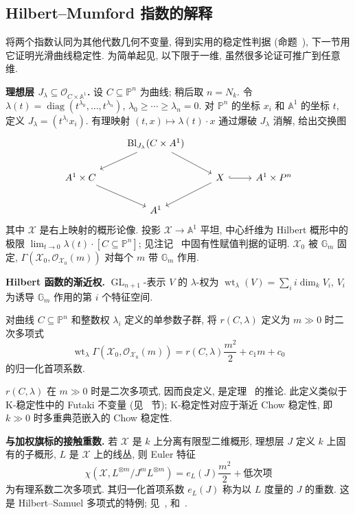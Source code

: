\subsection{Hilbert--Mumford 指数的解释}\label{src:6.8.2-subsection}
将两个指数认同为其他代数几何不变量, 得到实用的稳定性判据 (命题~), 下一节用它证明光滑曲线稳定性. 为简单起见, 以下限于一维, 虽然很多论证可推广到任意维.

\noindent\textbf{理想层 $J_\lambda\subseteq\mathcal O_{C\times\mathbb A^1}$.} 设 $C\subseteq\mathbb P^n$ 为曲线; 稍后取 $n=N_k$. 令 $\lambda(t)=\operatorname{diag}(t^{\lambda_0},\allowbreak \ldots,\allowbreak t^{\lambda_n})$, $\lambda_0\geq\cdots\geq\lambda_n=0$. 对 $\mathbb P^n$ 的坐标 $x_i$ 和 $\mathbb A^1$ 的坐标 $t$, 定义 $J_\lambda=(t^{\lambda_i}x_i)$. 有理映射 $(t,\allowbreak x)\mapsto\lambda(t)\cdot x$ 通过爆破 $J_\lambda$ 消解, 给出交换图
\[
\begin{tikzcd}
&\operatorname{Bl}_{J_\lambda}(C\times\mathbb A^1)\arrow[dl]\arrow[dr]&\\
\mathbb A^1\times C\arrow[dr]& &\mathcal X\arrow[r,hook]\arrow[dl]&\mathbb A^1\times\mathbb P^n\\
&\mathbb A^1&&
\end{tikzcd}
\]
其中 $\mathcal X$ 是右上映射的概形论像. 投影 $\mathcal X\to\mathbb A^1$ 平坦, 中心纤维为 Hilbert 概形中的极限 $\lim_{t\to0}\lambda(t)\cdot[C\subseteq\mathbb P^n]$; 见注记~ 中固有性赋值判据的证明. $\mathcal X_0$ 被 $\mathbb G_m$ 固定, $\Gamma(\mathcal X_0,\allowbreak \mathcal O_{\mathcal X_0}(m))$ 对每个 $m$ 带 $\mathbb G_m$ 作用.

\noindent\textbf{Hilbert 函数的渐近权.} $\operatorname{GL}_{n+1}$-表示 $V$ 的 $\lambda$-权为 $\operatorname{wt}_\lambda(V)=\sum_i i\dim_kV_i$, $V_i$ 为诱导 $\mathbb G_m$ 作用的第 $i$ 个特征空间.
\begin{definition}\label{src:6.8.8}
对曲线 $C\subseteq\mathbb P^n$ 和整数权 $\lambda_i$ 定义的单参数子群, 将 $r(C,\allowbreak \lambda)$ 定义为 $m\gg0$ 时二次多项式
\[
\operatorname{wt}_\lambda\Gamma(\mathcal X_0,\mathcal O_{\mathcal X_0}(m))
=r(C,\lambda)\frac{m^2}{2}+c_1m+c_0
\]
的归一化首项系数.
\end{definition}
$r(C,\allowbreak \lambda)$ 在 $m\gg0$ 时是二次多项式, 因而良定义, 是定理~ 的推论. 此定义类似于 K-稳定性中的 Futaki 不变量 (见~ 节); K-稳定性对应于渐近 Chow 稳定性, 即 $k\gg0$ 时多重典范嵌入的 Chow 稳定性.

\noindent\textbf{与加权旗标的接触重数.} 若 $\mathcal X$ 是 $k$ 上分离有限型二维概形, 理想层 $J$ 定义 $k$ 上固有的子概形, $L$ 是 $\mathcal X$ 上的线丛, 则 Euler 特征
\begin{equation}\label{src:6.8.9}
\chi(\mathcal X,L^{\otimes m}/J^mL^{\otimes m})=e_L(J)\frac{m^2}{2}+\text{低次项}
\end{equation}
为有理系数二次多项式. 其归一化首项系数 $e_L(J)$ 称为以 $L$ 度量的 $J$ 的重数. 这是 Hilbert--Samuel 多项式的特例; 见~\cite{Ram74}, \cite[命题 2.1]{Mum77} 和~\cite[\S12.1]{Eis95}.

